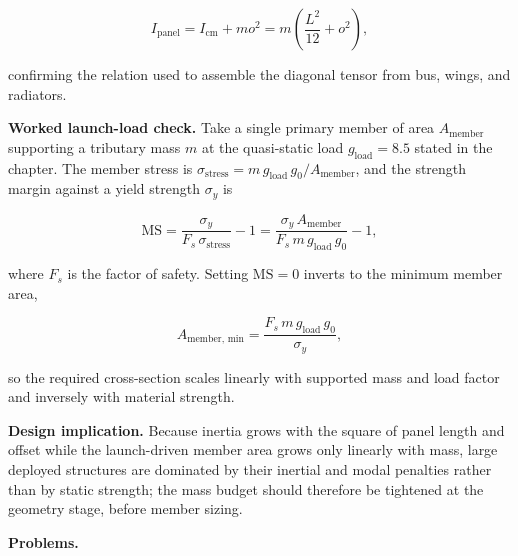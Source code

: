 \documentclass[
  11pt,
  openany,
  oneside]{book}
\begin{document}
\begin{equation}
I_{\mathrm{panel}} = I_{\mathrm{cm}} + m o^2 = m\left(\frac{L^2}{12} + o^2\right), \tag{12.4}
\end{equation}

confirming the relation used to assemble the diagonal tensor from bus,
wings, and radiators.

\textbf{Worked launch-load check.} Take a single primary member of area
\(A_{\mathrm{member}}\) supporting a tributary mass \(m\) at the
quasi-static load \(g_{\mathrm{load}} = 8.5\) stated in the chapter. The
member stress is
\(\sigma_{\mathrm{stress}} = m\,g_{\mathrm{load}}\,g_0 / A_{\mathrm{member}}\),
and the strength margin against a yield strength \(\sigma_y\) is

\begin{equation}
\mathrm{MS} = \frac{\sigma_y}{F_s\,\sigma_{\mathrm{stress}}} - 1 = \frac{\sigma_y\, A_{\mathrm{member}}}{F_s\, m\, g_{\mathrm{load}}\, g_0} - 1, \tag{12.5}
\end{equation}

where \(F_s\) is the factor of safety. Setting \(\mathrm{MS} = 0\)
inverts to the minimum member area,

\begin{equation}
A_{\mathrm{member,\,min}} = \frac{F_s\, m\, g_{\mathrm{load}}\, g_0}{\sigma_y}, \tag{12.6}
\end{equation}

so the required cross-section scales linearly with supported mass and
load factor and inversely with material strength.

\textbf{Design implication.} Because inertia grows with the square of
panel length and offset while the launch-driven member area grows only
linearly with mass, large deployed structures are dominated by their
inertial and modal penalties rather than by static strength; the mass
budget should therefore be tightened at the geometry stage, before
member sizing.

\textbf{Problems.}
\end{document}
